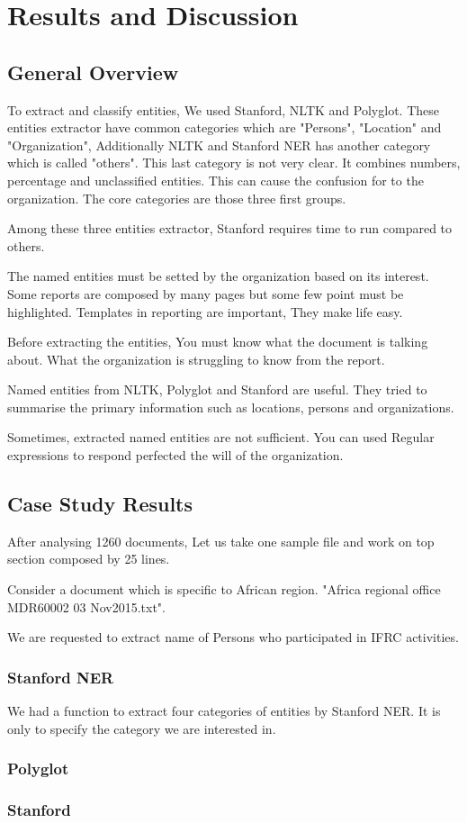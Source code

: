 \chapter{Results and Discussion}
\section{General Overview}
To extract and classify entities, We used Stanford, NLTK and Polyglot. These entities extractor have common categories which are "Persons", "Location" and "Organization", Additionally NLTK and Stanford NER has another category which is called "others". This last category is not very clear. It combines numbers, percentage and unclassified entities. This can cause the confusion for to the organization. The core categories are those three first groups.

Among these three entities extractor, Stanford requires time to run compared to others.

The named entities must be setted by the organization based on its interest. Some reports are composed by many pages but some few point must be highlighted. Templates in reporting are important, They make life easy.

Before extracting the entities, You must know what the document is  talking about. What the organization is struggling to know from the report.


Named entities from NLTK, Polyglot and Stanford are useful. They tried to summarise the primary information such as locations, persons and organizations. 

Sometimes, extracted named entities are not sufficient. You can  used Regular expressions to respond perfected the will of the organization.

\section{Case Study Results}
After analysing 1260 documents, Let us take one sample file and work on top section composed by 25 lines.

Consider a document which is specific to African region. "Africa regional office MDR60002 03 Nov2015.txt".

We are requested to extract name of Persons who participated in IFRC activities.

\subsection{Stanford NER}

We had a function to extract four categories of entities by Stanford NER. It is only to specify the category we are interested in.
\subsection{Polyglot}
\subsection{Stanford}